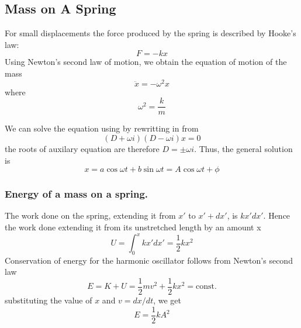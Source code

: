 \documentclass[../../main.tex]{subfiles}
\begin{document}
\subsection{Mass on A Spring}
For small displacements the force produced by the spring is described by Hooke's law:
\begin{equation*}
    F = -kx 
\end{equation*}
Using Newton's second law of motion, we obtain the equation of motion of the mass
\begin{equation*}
   \ddot{x}=-\omega^2 x
\end{equation*}
where\begin{equation*}
    \omega^2=\frac{k}{m}
\end{equation*}

We can solve the equation using by rewritting in from
\begin{equation*}
    (D+\omega i)(D-\omega i)x=0
\end{equation*}
the roots of auxilary equation are therefore $D=\pm \omega i$. Thus, the general solution is
\begin{equation*}
    x=a\cos \omega t+ b \sin \omega t= A\cos \omega t +\phi
\end{equation*}

\subsubsection{Energy of a mass on a spring.} The work done on the spring, extending it from $x'$ to $ x' + dx'$, is $kx'dx'$. Hence the work done extending it from its unstretched length by an amount x
\begin{equation*}
    U=\int_{0}^{x}kx'dx'= \frac{1}{2} kx^2
\end{equation*}
Conservation of energy for the harmonic oscillator follows from Newton's second law
\begin{equation*}
    E=K+U=\frac{1}{2}mv^2+\frac{1}{2}kx^2=\text{const.}
\end{equation*}
substituting the value of $x$ and $v=dx/dt$, we get
\begin{equation*}
    E=\frac{1}{2}kA^2
\end{equation*}
\end{document}
